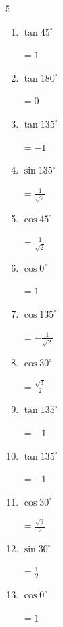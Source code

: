 \begin{multicols}{5}
\begin{enumerate}
  \item $\displaystyle \tan{45^\circ}$

        $\displaystyle =1$

  \item $\displaystyle \tan{180^\circ}$

        $\displaystyle =0$

  \item $\displaystyle \tan{135^\circ}$

        $\displaystyle =-1$

  \item $\displaystyle \sin{135^\circ}$

        $\displaystyle =\frac{1}{\sqrt{2}}$

  \item $\displaystyle \cos{45^\circ}$

        $\displaystyle =\frac{1}{\sqrt{2}}$

\columnbreak %

  \item $\displaystyle \cos{0^\circ}$

        $\displaystyle =1$

  \item $\displaystyle \cos{135^\circ}$

        $\displaystyle =-\frac{1}{\sqrt{2}}$

  \item $\displaystyle \cos{30^\circ}$

        $\displaystyle =\frac{\sqrt{3}}{2}$

  \item $\displaystyle \tan{135^\circ}$

        $\displaystyle =-1$

  \item $\displaystyle \tan{135^\circ}$

        $\displaystyle =-1$

  \item $\displaystyle \cos{30^\circ}$

        $\displaystyle =\frac{\sqrt{3}}{2}$

  \item $\displaystyle \sin{30^\circ}$

        $\displaystyle =\frac{1}{2}$

  \item $\displaystyle \cos{0^\circ}$

        $\displaystyle =1$


\end{enumerate}
\end{multicols}
